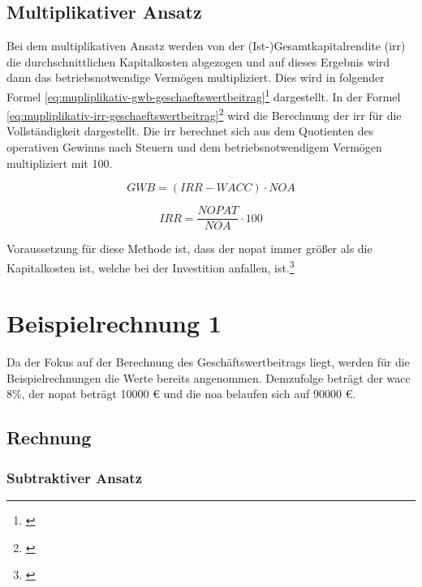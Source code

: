 \subsection{Multiplikativer Ansatz}

Bei dem multiplikativen Ansatz werden von der (Ist-)Gesamtkapitalrendite (\ac{irr}) die durchschnittlichen Kapitalkosten abgezogen und auf dieses Ergebnis wird dann das betriebsnotwendige Vermögen multipliziert. Dies wird in folgender Formel \eqref{eq:mupliplikativ-gwb-geschaeftswertbeitrag}\footnote{\cite{wikipedia-eva}} dargestellt. In der Formel \eqref{eq:mupliplikativ-irr-geschaeftswertbeitrag}\footnote{\cite{controllingportal-eva}} wird die Berechnung der \ac{irr} für die Vollständigkeit dargestellt. Die \ac{irr} berechnet sich aus dem Quotienten des operativen Gewinns nach Steuern und dem betriebsnotwendigem Vermögen multipliziert mit 100.

\begin{equation}
    GWB = (IRR - WACC) \cdot NOA
    \label{eq:mupliplikativ-gwb-geschaeftswertbeitrag}
\end{equation}

\begin{equation}
    IRR = \frac{NOPAT}{NOA} \cdot 100
    \label{eq:mupliplikativ-irr-geschaeftswertbeitrag}
\end{equation}

\bigskip

\noindent
Voraussetzung für diese Methode ist, dass der \ac{nopat} immer größer als die Kapitalkosten ist, welche bei der Investition anfallen, ist.\footnote{\cite{bwllexicon-eva}}

\section{Beispielrechnung 1}

Da der Fokus auf der Berechnung des Geschäftswertbeitrags liegt, werden für die Beispielrechnungen die Werte bereits angenommen. Demzufolge beträgt der \ac{wacc} 8\%, der \ac{nopat} beträgt 10000 € und die \ac{noa} belaufen sich auf 90000 €.

\subsection{Rechnung}

\subsubsection{Subtraktiver Ansatz}

